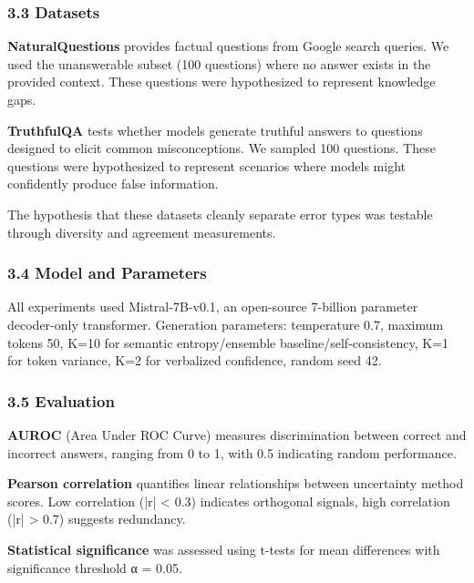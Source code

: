 \subsubsection{3.3 Datasets}

\textbf{NaturalQuestions} provides factual questions from Google search queries. We used the unanswerable subset (100 questions) where no answer exists in the provided context. These questions were hypothesized to represent knowledge gaps.

\textbf{TruthfulQA} tests whether models generate truthful answers to questions designed to elicit common misconceptions. We sampled 100 questions. These questions were hypothesized to represent scenarios where models might confidently produce false information.

The hypothesis that these datasets cleanly separate error types was testable through diversity and agreement measurements.

\subsubsection{3.4 Model and Parameters}

All experiments used Mistral-7B-v0.1, an open-source 7-billion parameter decoder-only transformer. Generation parameters: temperature 0.7, maximum tokens 50, K=10 for semantic entropy/ensemble baseline/self-consistency, K=1 for token variance, K=2 for verbalized confidence, random seed 42.

\subsubsection{3.5 Evaluation}

\textbf{AUROC} (Area Under ROC Curve) measures discrimination between correct and incorrect answers, ranging from 0 to 1, with 0.5 indicating random performance.

\textbf{Pearson correlation} quantifies linear relationships between uncertainty method scores. Low correlation (|r| < 0.3) indicates orthogonal signals, high correlation (|r| > 0.7) suggests redundancy.

\textbf{Statistical significance} was assessed using t-tests for mean differences with significance threshold α = 0.05.
